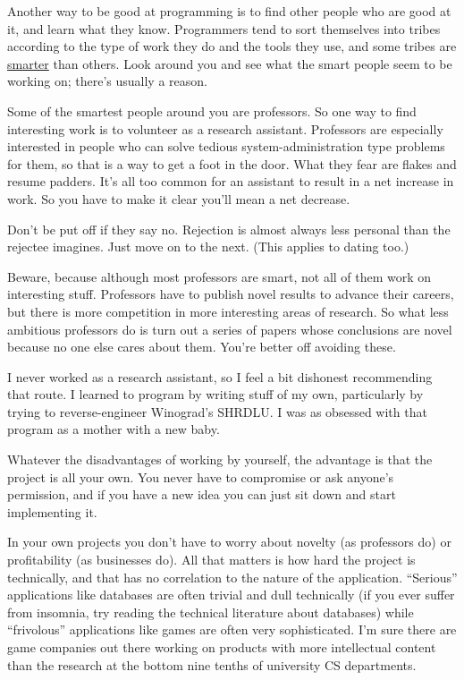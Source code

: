 Another way to be good at programming is to find other people who are
good at it, and learn what they know. Programmers tend to sort
themselves into tribes according to the type of work they do and the
tools they use, and some tribes are \href{pypar.html}{smarter} than
others. Look around you and see what the smart people seem to be working
on; there's usually a reason.

Some of the smartest people around you are professors. So one way to
find interesting work is to volunteer as a research assistant.
Professors are especially interested in people who can solve tedious
system-administration type problems for them, so that is a way to get a
foot in the door. What they fear are flakes and resume padders. It's all
too common for an assistant to result in a net increase in work. So you
have to make it clear you'll mean a net decrease.

Don't be put off if they say no. Rejection is almost always less
personal than the rejectee imagines. Just move on to the next. (This
applies to dating too.)

Beware, because although most professors are smart, not all of them work
on interesting stuff. Professors have to publish novel results to
advance their careers, but there is more competition in more interesting
areas of research. So what less ambitious professors do is turn out a
series of papers whose conclusions are novel because no one else cares
about them. You're better off avoiding these.

I never worked as a research assistant, so I feel a bit dishonest
recommending that route. I learned to program by writing stuff of my
own, particularly by trying to reverse-engineer Winograd's SHRDLU. I was
as obsessed with that program as a mother with a new baby.

Whatever the disadvantages of working by yourself, the advantage is that
the project is all your own. You never have to compromise or ask
anyone's permission, and if you have a new idea you can just sit down
and start implementing it.

In your own projects you don't have to worry about novelty (as
professors do) or profitability (as businesses do). All that matters is
how hard the project is technically, and that has no correlation to the
nature of the application. ``Serious'' applications like databases are
often trivial and dull technically (if you ever suffer from insomnia,
try reading the technical literature about databases) while
``frivolous'' applications like games are often very sophisticated. I'm
sure there are game companies out there working on products with more
intellectual content than the research at the bottom nine tenths of
university CS departments.

